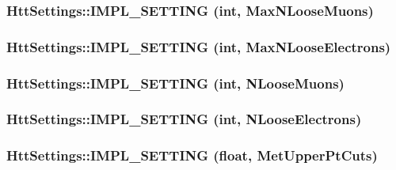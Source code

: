 \label{classHttSettings_a01f8ffe8b57c0e0a5ce42ddea4074b10}
\hypertarget{classHttSettings_adc4635682f2e9862ce8b2fb48bd253e3}{
\subsubsection[{IMPL\_\-SETTING}]{\setlength{\rightskip}{0pt plus 5cm}HttSettings::IMPL\_\-SETTING (int, \/  MaxNLooseMuons)}}
\label{classHttSettings_adc4635682f2e9862ce8b2fb48bd253e3}
\hypertarget{classHttSettings_a95f6a64613094769937b40065e7aadcd}{
\subsubsection[{IMPL\_\-SETTING}]{\setlength{\rightskip}{0pt plus 5cm}HttSettings::IMPL\_\-SETTING (int, \/  MaxNLooseElectrons)}}
\label{classHttSettings_a95f6a64613094769937b40065e7aadcd}
\hypertarget{classHttSettings_a5aeb8f008ab1bbc858b8057335997611}{
\subsubsection[{IMPL\_\-SETTING}]{\setlength{\rightskip}{0pt plus 5cm}HttSettings::IMPL\_\-SETTING (int, \/  NLooseMuons)}}
\label{classHttSettings_a5aeb8f008ab1bbc858b8057335997611}
\hypertarget{classHttSettings_a37f7d51513391d0069be00e70ac80d6c}{
\subsubsection[{IMPL\_\-SETTING}]{\setlength{\rightskip}{0pt plus 5cm}HttSettings::IMPL\_\-SETTING (int, \/  NLooseElectrons)}}
\label{classHttSettings_a37f7d51513391d0069be00e70ac80d6c}
\hypertarget{classHttSettings_a2939619972a67313042065bb11281e49}{
\subsubsection[{IMPL\_\-SETTING}]{\setlength{\rightskip}{0pt plus 5cm}HttSettings::IMPL\_\-SETTING (float, \/  MetUpperPtCuts)}}
